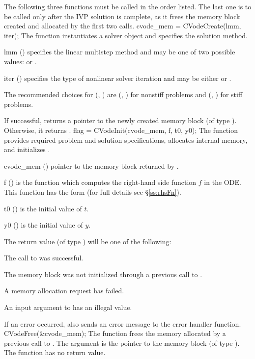 The following three functions must be called in the order listed. The last one
is to be called only after the IVP solution is complete, as it frees the
{\cvode} memory block created and allocated by the first two calls.
{
  cvode\_mem = CVodeCreate(lmm, iter);
}
{
  The function  instantiates a {\cvode} solver object and
  specifies the solution method.
}
{
  \begin{args}[iter]
  \item[lmm] ()
    specifies the linear multistep method and may be one of two
    possible values:  or .     
  \item[iter] ()
    specifies the type of nonlinear solver iteration and may be
    either  or . 
  \end{args}
  The recommended choices for (, ) are
  (, ) for nonstiff problems and
  (, ) for stiff problems.
}
{
  If successful,  returns a pointer to the newly created 
  {\cvode} memory block (of type ).  Otherwise, it returns .
}
{}
{
flag = CVodeInit(cvode\_mem, f, t0, y0);
}
{
  The function  provides required problem and solution
  specifications, allocates internal memory, and initializes {\cvode}.
}
{
  \begin{args}
  \item[cvode\_mem] ()
    pointer to the {\cvode} memory block returned by .
  \item[f] ()
    is the {\CC} function which computes the right-hand side function $f$ in the ODE.
    This function has the form  (for full details see
    \S\ref{ss:rhsFn}).
  \item[t0] ()
    is the initial value of $t$.
  \item[y0] ()
    is the initial value of $y$. 
  \end{args}
}
{
  The return value  (of type ) will be one of the following:
  \begin{args}
  \item[\Id{CV\_SUCCESS}]
    The call to  was successful.
  \item[\Id{CV\_MEM\_NULL}] 
    The {\cvode} memory block was not initialized through a previous call
    to .
  \item[\Id{CV\_MEM\_FAIL}] 
    A memory allocation request has failed.
  \item[\Id{CV\_ILL\_INPUT}] 
    An input argument to  has an illegal value.
  \end{args}
}
{
  If an error occurred,  also sends an error message to the
  error handler function.
}
{
  CVodeFree(\&cvode\_mem);
}
{
  The function  frees the memory allocated by
  a previous call to .
}
{
  The argument is the pointer to the {\cvode} memory block (of type ).
}
{
  The function  has no return value.
}
{}


